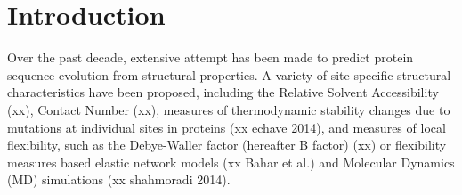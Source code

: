 \documentclass[11pt]{article}
\newenvironment{Abstract}{\begin{quotation}  }{\end{quotation}}
\begin{document}
\begin{titlepage}
\begin{Abstract}
\end{Abstract}
\vfill
\vfill
\end{titlepage}
\def\thefootnote{\fnsymbol{footnote}}
\setcounter{footnote}{0}
%

\section{Introduction}
\label{sec:intro}

    Over the past decade, extensive attempt has been made to predict protein sequence evolution from structural properties.  A variety of site-specific structural characteristics have been proposed, including the Relative Solvent Accessibility (xx), Contact Number (xx), measures of thermodynamic stability changes due to mutations at individual sites in proteins \citep[e.g., the quantity ddG rate in][]{}(xx echave 2014), and measures of local flexibility, such as the Debye-Waller factor (hereafter B factor) (xx) or flexibility measures based elastic network models (xx Bahar et al.) and Molecular Dynamics (MD) simulations (xx shahmoradi 2014). \\
\end{document}
